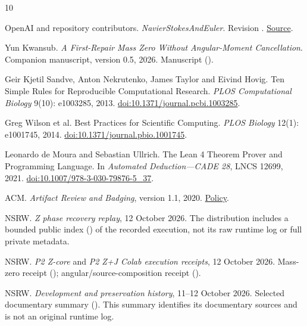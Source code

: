 \documentclass[11pt,a4paper]{article}
\begin{document}
\begin{thebibliography}{10}

OpenAI and repository contributors. \emph{NavierStokesAndEuler}. Revision . \href{https://github.com/openai/NavierStokesAndEuler/tree/8937a8f4cbc7abaab5e9e97d1cc7f5d2319d9538}{Source}.

Yun Kwansub. \emph{A First-Repair Mass Zero Without Angular-Moment Cancellation}. Companion manuscript, version 0.5, 2026. Manuscript ().

Geir Kjetil Sandve, Anton Nekrutenko, James Taylor and Eivind Hovig. Ten Simple Rules for Reproducible Computational Research. \emph{PLOS Computational Biology} 9(10): e1003285, 2013. \href{https://doi.org/10.1371/journal.pcbi.1003285}{doi:10.1371/journal.pcbi.1003285}.

Greg Wilson et al. Best Practices for Scientific Computing. \emph{PLOS Biology} 12(1): e1001745, 2014. \href{https://doi.org/10.1371/journal.pbio.1001745}{doi:10.1371/journal.pbio.1001745}.

Leonardo de Moura and Sebastian Ullrich. The Lean 4 Theorem Prover and Programming Language. In \emph{Automated Deduction---CADE 28}, LNCS 12699, 2021. \href{https://doi.org/10.1007/978-3-030-79876-5_37}{doi:10.1007/978-3-030-79876-5\_37}.

ACM. \emph{Artifact Review and Badging}, version 1.1, 2020. \href{https://www.acm.org/publications/policies/artifact-review-and-badging-current}{Policy}.

NSRW. \emph{Z phase recovery replay}, 12 October 2026. The distribution includes a bounded public index () of the recorded execution, not its raw runtime log or full private metadata.

NSRW. \emph{P2 Z-core} and \emph{P2 Z+J Colab execution receipts}, 12 October 2026. Mass-zero receipt (); angular/source-composition receipt ().

NSRW. \emph{Development and preservation history}, 11--12 October 2026. Selected documentary summary (). This summary identifies its documentary sources and is not an original runtime log.


\end{thebibliography}
\end{document}

